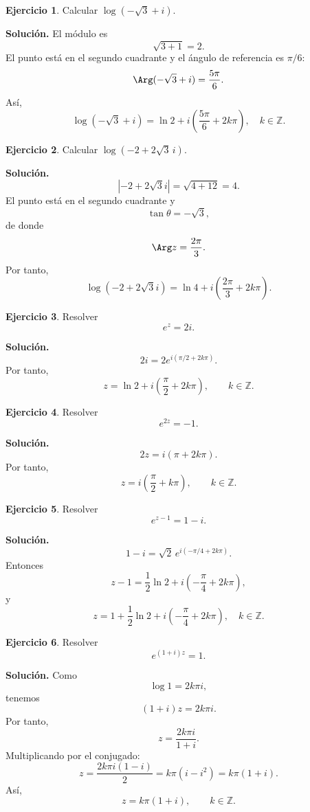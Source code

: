\documentclass[12pt]{article}
\theoremstyle{definition}
\newtheorem{ejercicio}{Ejercicio}[section]
\theoremstyle{remark}
\begin{document}
\begin{ejercicio}
Calcular $\log(-\sqrt3+i)$.
\end{ejercicio}

\textbf{Solución.}
El módulo es
\[
\sqrt{3+1}=2.
\]
El punto está en el segundo cuadrante y el ángulo de referencia es $\pi/6$:
\[
\Arg(-\sqrt3+i)=\frac{5\pi}{6}.
\]
Así,
\[
\boxed{
\log(-\sqrt3+i)
=
\ln2+i\left(\frac{5\pi}{6}+2k\pi\right),
\quad k\in\mathbb Z.
}
\]

\begin{ejercicio}
Calcular $\log(-2+2\sqrt3\,i)$.
\end{ejercicio}

\textbf{Solución.}
\[
|-2+2\sqrt3 i|
=\sqrt{4+12}=4.
\]
El punto está en el segundo cuadrante y
\[
\tan\theta=-\sqrt3,
\]
de donde
\[
\Arg z=\frac{2\pi}{3}.
\]
Por tanto,
\[
\boxed{
\log(-2+2\sqrt3 i)
=
\ln4+i\left(\frac{2\pi}{3}+2k\pi\right).
}
\]

\begin{ejercicio}
Resolver
\[
e^z=2i.
\]
\end{ejercicio}

\textbf{Solución.}
\[
2i=2e^{i(\pi/2+2k\pi)}.
\]
Por tanto,
\[
\boxed{
z=\ln2+i\left(\frac{\pi}{2}+2k\pi\right),
\qquad k\in\mathbb Z.
}
\]

\begin{ejercicio}
Resolver
\[
e^{2z}=-1.
\]
\end{ejercicio}

\textbf{Solución.}
\[
2z=i(\pi+2k\pi).
\]
Por tanto,
\[
\boxed{
z=i\left(\frac{\pi}{2}+k\pi\right),
\qquad k\in\mathbb Z.
}
\]

\begin{ejercicio}
Resolver
\[
e^{z-1}=1-i.
\]
\end{ejercicio}

\textbf{Solución.}
\[
1-i=\sqrt2\,e^{i(-\pi/4+2k\pi)}.
\]
Entonces
\[
z-1
=
\frac12\ln2
+i\left(-\frac{\pi}{4}+2k\pi\right),
\]
y
\[
\boxed{
z=
1+\frac12\ln2
+i\left(-\frac{\pi}{4}+2k\pi\right),
\quad k\in\mathbb Z.
}
\]

\begin{ejercicio}
Resolver
\[
e^{(1+i)z}=1.
\]
\end{ejercicio}

\textbf{Solución.}
Como
\[
\log1=2k\pi i,
\]
tenemos
\[
(1+i)z=2k\pi i.
\]
Por tanto,
\[
z=\frac{2k\pi i}{1+i}.
\]
Multiplicando por el conjugado:
\[
z=
\frac{2k\pi i(1-i)}{2}
=k\pi(i-i^2)
=k\pi(1+i).
\]
Así,
\[
\boxed{
z=k\pi(1+i),\qquad k\in\mathbb Z.
}
\]
\end{document}
